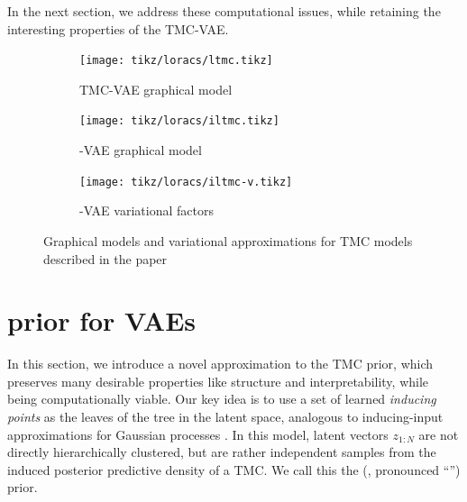 In the next section, we address these computational
issues, while retaining
the interesting properties of the TMC-VAE.

\begin{figure}[t]
\centering
\begin{subfigure}[t]{0.3\textwidth}
    \centering
    \texttt{[image: tikz/loracs/ltmc.tikz]}
    \caption{TMC-VAE graphical model}
\end{subfigure}
\begin{subfigure}[t]{0.34\textwidth}
    \centering
    \texttt{[image: tikz/loracs/iltmc.tikz]}
    \caption{\acronym-VAE graphical model}
\end{subfigure}
\begin{subfigure}[t]{0.34\textwidth}
    \centering
    \texttt{[image: tikz/loracs/iltmc-v.tikz]}
    \caption{\acronym-VAE variational factors}
\end{subfigure}
\caption{Graphical models and variational
approximations for TMC models described in the paper}
\label{fig:graphical-models}
\end{figure}

\section{\acronym\;prior for VAEs}

In this section, we introduce
a novel approximation to the TMC
prior, which preserves many 
desirable properties
like structure and interpretability,
while being computationally viable.
Our key idea is to use a set of
learned \emph{inducing points}
as the leaves of the tree in the latent
space, analogous to inducing-input
approximations for Gaussian processes \citep{snelson2006sparse}. 
In this model, latent vectors $z_{1:N}$
are not directly hierarchically clustered,
but are rather independent samples
from the induced posterior predictive density
of a TMC.
We call this the \acronymexplanation\;(\emph{\acronym}, pronounced ``\acronympronunciation'') prior.


